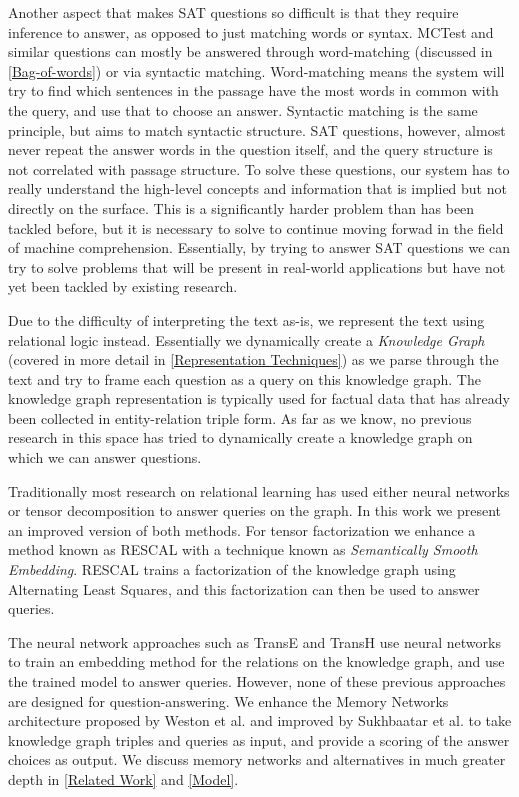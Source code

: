 \documentclass[pageno]{jpaper}
\begin{document}
Another aspect that makes SAT questions so difficult is that they require
inference to answer, as opposed to just matching words or syntax. MCTest and
similar questions can mostly be answered through word-matching (discussed in
\ref{Bag-of-words}) or via syntactic matching. Word-matching means the system
will try to find which sentences in the passage have the most words in common
with the query, and use that to choose an answer. Syntactic matching is the same
principle, but aims to match syntactic structure. SAT questions, however, almost
never repeat the answer words in the question itself, and the query structure is
not correlated with passage structure. To solve these questions, our system has
to really understand the high-level concepts and information that is implied but
not directly on the surface. This is a significantly harder problem than has
been tackled before, but it is necessary to solve to continue moving forwad in
the field of machine comprehension. Essentially, by trying to answer SAT
questions we can try to solve problems that will be present in real-world
applications but have not yet been tackled by existing research.

Due to the difficulty of interpreting the text as-is, we represent the text
using relational logic instead. Essentially we dynamically create a
\textit{Knowledge Graph} (covered in more detail in \ref{Representation
Techniques}) as we parse through the text and try to frame each question as a
query on this knowledge graph. The knowledge graph representation is typically
used for factual data that has already been collected in entity-relation triple
form. As far as we know, no previous research in this space has tried to
dynamically create a knowledge graph on which we can answer questions.

Traditionally most research on relational learning has used either neural
networks or tensor decomposition to answer queries on the graph. In this work we
present an improved version of both methods. For tensor factorization we enhance
a method known as RESCAL\cite{Bader2007}\cite{Nickel2011} with a technique known
as \textit{Semantically Smooth Embedding}\cite{Guo2015}. RESCAL trains a
factorization of the knowledge graph using Alternating Least Squares, and this
factorization can then be used to answer queries.

The neural network approaches such as TransE\cite{Bordes2013} and
TransH\cite{Wang2014} use neural networks to train an embedding method for the
relations on the knowledge graph, and use the trained model to answer queries.
However, none of these previous approaches are designed for question-answering.
We enhance the Memory Networks architecture proposed by Weston et
al.\cite{Weston2015a} and improved by Sukhbaatar et al.\cite{Sukhbaatar2015} to
take knowledge graph triples and queries as input, and provide a scoring of the
answer choices as output. We discuss memory networks and alternatives in much
greater depth in \ref{Related Work} and \ref{Model}.
\end{document}
